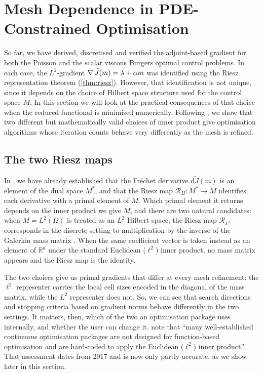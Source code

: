 \documentclass[a4paper,11pt]{article}
\newcommand{\R}{\mathbb{R}}
\newcommand{\Om}{\Omega}
\newcommand{\Lp}[1]{L^{2}(#1)}              %
\newcommand{\Rmap}{\mathcal{R}}              %
\newcommand{\Jt}{\tilde{J}}                  %
\newcommand{\Mspace}{M}
\theoremstyle{spacedplain} \newtheorem{theorem}[counter]{Theorem} \newtheorem{lemma}[counter]{Lemma} \newtheorem{prop}[counter]{Proposition} \newtheorem{cor}[counter]{Corollary}
\theoremstyle{spaceddefinition} \newtheorem{defn}[counter]{Definition} \newtheorem{example}[counter]{Example} \newtheorem{remark}[counter]{Remark}
\begin{document}
\section{Mesh Dependence in PDE-Constrained Optimisation}
\label{sec:mesh-dependence}

So far, we have derived, discretised and verified the adjoint-based gradient for both the Poisson and the scalar viscous Burgers optimal control problems. In each case, the $L^2$-gradient $\grad \Jt(m) = \lambda + \alpha m$ was identified using the Riesz representation theorem (\cref{thm:riesz}). However, that identification is not unique, since it depends on the choice of Hilbert space structure used for the control space $\Mspace$. In this section we will look at the practical consequences of that choice when the reduced functional is minimised numerically. Following \citet[Chap.~2]{shfp2017}, we show that two different but mathematically valid choices of inner product give optimisation algorithms whose iteration counts behave very differently as the mesh is refined.

\subsection{The two Riesz maps}
\label{sec:meshdep:background}

In , we have already established that the Fr{\'e}chet derivative $\mathrm{d}\Jt(m)$ is an element of the dual space $\Mspace^{*}$, and that the Riesz map $\Rmap_H : \Mspace^{*} \to \Mspace$ identifies each derivative with a primal element of $\Mspace$. Which primal element it returns depends on the inner product we give $\Mspace$, and there are two natural candidates: when $\Mspace = \Lp{\Om}$ is treated as an $L^{2}$ Hilbert space, the Riesz map $\Rmap_{L^2}$ corresponds in the discrete setting to multiplication by the inverse of the Galerkin mass matrix \citep[(1.125)]{shfp2017}. When the same coefficient vector is taken instead as an element of $\R^{d}$ under the standard Euclidean ($\ell^{2}$) inner product, no mass matrix appears and the Riesz map is the identity.

The two choices give us primal gradients that differ at every mesh refinement: the $\ell^{2}$ representer carries the local cell sizes encoded in the diagonal of the mass matrix, while the $L^{2}$ representer does not. So, we can see that search directions and stopping criteria based on gradient norms behave differently in the two settings. It matters, then, which of the two an optimisation package uses internally, and whether the user can change it.  note that ``many well-established continuous optimisation packages are not designed for function-based optimisation and are hard-coded to apply the Euclidean ($\ell^{2}$) inner product''. That assessment dates from 2017 and is now only partly accurate, as we show later in this section.
\end{document}
